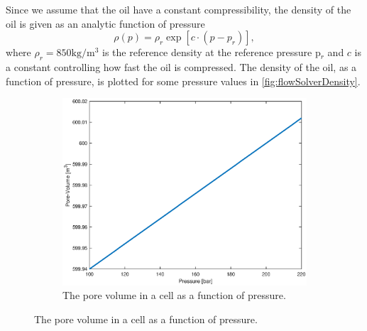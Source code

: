 Since we assume that the oil have a constant compressibility, the density of the oil is given as an analytic function of pressure 
\begin{equation}
    \rho(p) = \rho_r\exp[c\cdot(p-p_r)],
    \label{eq:pressureSolverDensity}
\end{equation}
where $\rho_r = 850\text{kg}/\text{m}^3$ is the reference density at the reference pressure p$_r$ and $c$ is a constant controlling how fast the oil is compressed. The density of the oil, as a function of pressure, is plotted for some pressure values in \autoref{fig:flowSolverDensity}.
\begin{figure}[H]
    \centering
    \begin{subfigure}[t]{0.48\textwidth}
        \includegraphics[width=\textwidth]{figures/flow_solver_pore-volume.eps}
        \caption{The pore volume in a cell as a function of pressure.}
        \label{fig:flowSolverPoreVolume}
        

\end{subfigure}
\end{figure}
